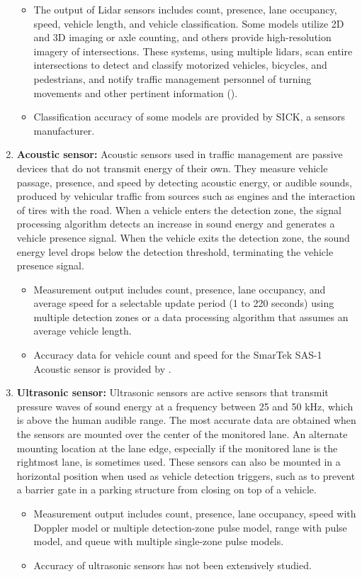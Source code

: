 \begin{enumerate}
    \begin{itemize}
        \item The output of Lidar sensors includes count, presence, lane occupancy, speed, vehicle length, and vehicle classification. Some models utilize 2D and 3D imaging or axle counting, and others provide high-resolution imagery of intersections. These systems, using multiple lidars, scan entire intersections to detect and classify motorized vehicles, bicycles, and pedestrians, and notify traffic management personnel of turning movements and other pertinent information (\textcite{Taylor2022}).
        \item Classification accuracy of some models are provided by SICK, a sensors manufacturer.
    \end{itemize}
    \item \textbf{Acoustic sensor:} Acoustic sensors used in traffic management are passive devices that do not transmit energy of their own. They measure vehicle passage, presence, and speed by detecting acoustic energy, or audible sounds, produced by vehicular traffic from sources such as engines and the interaction of tires with the road. When a vehicle enters the detection zone, the signal processing algorithm detects an increase in sound energy and generates a vehicle presence signal. When the vehicle exits the detection zone, the sound energy level drops below the detection threshold, terminating the vehicle presence signal.
    \begin{itemize}
        \item Measurement output includes count, presence, lane occupancy, and average speed for a selectable update period (1 to 220 seconds) using multiple detection zones or a data processing algorithm that assumes an average vehicle length.
        \item Accuracy data for vehicle count and speed for the SmarTek SAS-1 Acoustic sensor is provided by \textcite{middleton2000initial}.
    \end{itemize}
    \item \textbf{Ultrasonic sensor:} Ultrasonic sensors are active sensors that transmit pressure waves of sound energy at a frequency between 25 and 50 kHz, which is above the human audible range. The most accurate data are obtained when the sensors are mounted over the center of the monitored lane. An alternate mounting location at the lane edge, especially if the monitored lane is the rightmost lane, is sometimes used. These sensors can also be mounted in a horizontal position when used as vehicle detection triggers, such as to prevent a barrier gate in a parking structure from closing on top of a vehicle.
    \begin{itemize}
        \item Measurement output includes count, presence, lane occupancy, speed with Doppler model or multiple detection-zone pulse model, range with pulse model, and queue with multiple single-zone pulse models.
        \item Accuracy of ultrasonic sensors has not been extensively studied.
    \end{itemize}    
\end{enumerate}
   

